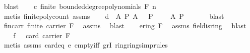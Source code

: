 \begin{isabellebody}
\ blast\isanewline
\ \ \isamarkupfalse%
\ c{\isacharcolon}{\kern0pt}\ {\isachardoublequoteopen}finite\ {\isacharparenleft}{\kern0pt}bounded{\isacharunderscore}{\kern0pt}degree{\isacharunderscore}{\kern0pt}polynomials\ F\ n{\isacharparenright}{\kern0pt}{\isachardoublequoteclose}\isanewline
\ \ \ \ \isamarkupfalse%
\ {\isacharparenleft}{\kern0pt}metis\ finite{\isacharunderscore}{\kern0pt}poly{\isacharunderscore}{\kern0pt}count\ assms{\isacharparenleft}{\kern0pt}{}{\isacharparenright}{\kern0pt}{\isacharparenright}{\kern0pt}\isanewline
\ \ \isamarkupfalse%
\ d{\isacharcolon}{\kern0pt}\ {\isachardoublequoteopen}{\isasymAnd}\ A\ P{\isachardot}{\kern0pt}\ A\ {\isasyminter}\ {\isacharbraceleft}{\kern0pt}{\isasymomega}{\isachardot}{\kern0pt}\ P\ {\isasymomega}{\isacharbraceright}{\kern0pt}\ {\isacharequal}{\kern0pt}\ {\isacharbraceleft}{\kern0pt}{\isasymomega}\ {\isasymin}\ A{\isachardot}{\kern0pt}\ P\ {\isasymomega}{\isacharbraceright}{\kern0pt}{\isachardoublequoteclose}\isanewline
\ \ \ \ \isamarkupfalse%
\ blast\isanewline
\isanewline
\ \ \isamarkupfalse%
\ fin{\isacharunderscore}{\kern0pt}carr{\isacharcolon}{\kern0pt}\ {\isachardoublequoteopen}finite\ {\isacharparenleft}{\kern0pt}carrier\ F{\isacharparenright}{\kern0pt}{\isachardoublequoteclose}\ \isamarkupfalse%
\ assms{\isacharparenleft}{\kern0pt}{}{\isacharparenright}{\kern0pt}\ \isamarkupfalse%
\ blast\isanewline
\ \ \isamarkupfalse%
\ e{\isacharcolon}{\kern0pt}{\isachardoublequoteopen}ring\ F{\isachardoublequoteclose}\ \isamarkupfalse%
\ assms{\isacharparenleft}{\kern0pt}{}{\isacharparenright}{\kern0pt}\ field{\isachardot}{\kern0pt}is{\isacharunderscore}{\kern0pt}ring\ \isamarkupfalse%
\ blast\isanewline
\ \ \isamarkupfalse%
\ f{\isacharcolon}{\kern0pt}\ {\isachardoublequoteopen}{}\ {\isacharless}{\kern0pt}\ card\ {\isacharparenleft}{\kern0pt}carrier\ F{\isacharparenright}{\kern0pt}{\isachardoublequoteclose}\ \isanewline
\ \ \ \ \isamarkupfalse%
\ {\isacharparenleft}{\kern0pt}metis\ assms{\isacharparenleft}{\kern0pt}{}{\isacharparenright}{\kern0pt}\ card{\isacharunderscore}{\kern0pt}{}{\isacharunderscore}{\kern0pt}eq\ e\ empty{\isacharunderscore}{\kern0pt}iff\ gr{}I\ ring{\isachardot}{\kern0pt}ring{\isacharunderscore}{\kern0pt}simprules{\isacharparenleft}{\kern0pt}{}{\isacharparenright}{\kern0pt}{\isacharparenright}{\kern0pt}\isanewline

\end{isabellebody}
